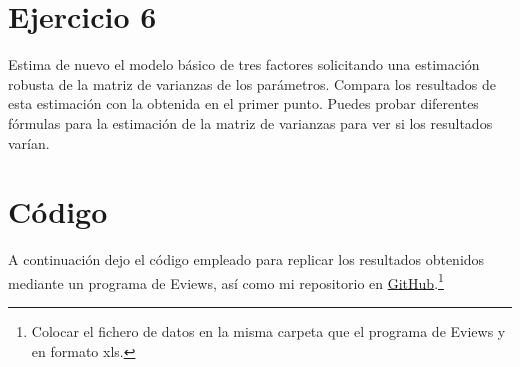 \documentclass[12pt]{article}
\numberwithin{equation}{section} %
\begin{document}
\section{Ejercicio 6} Estima de nuevo el modelo básico de tres factores solicitando una estimación robusta de la matriz de varianzas de los parámetros. Compara los resultados de esta estimación con la obtenida en el primer punto. Puedes probar diferentes fórmulas para la estimación de la matriz de varianzas para ver si los resultados varían.


\section{Código}

A continuación dejo el código empleado para replicar los resultados obtenidos mediante un programa de Eviews, así como mi repositorio en \href{https://github.com/mdelallave/Econometria_financiera/tree/master/primera_entrega}{GitHub}.\footnote{Colocar el fichero de datos en la misma carpeta que el programa de Eviews y en formato xls.}


\end{document}
